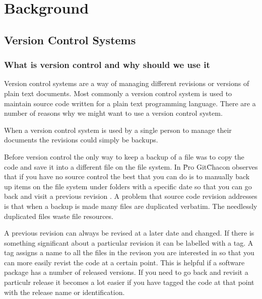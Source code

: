 \chapter{Background}

\section{Version Control Systems}
\subsection{What is version control and why should we use it}
Version control systems are a way of managing different revisions or versions of plain text documents. Most commonly a version control system is used to maintain source code written for a plain text programming language.  There are a number of reasons why we might want to use a version control system.

When a version control system is used by a single person to manage their documents the revisions could simply be backups.

Before version control the only way to keep a backup of a file was to copy the code and save it into a different file on the file system.
In \"Pro Git\" Chacon observes that if you have no source control the best that you can do is to manually back up items on the file system under folders with a specific date so that you can go back and visit a previous revision \cite{Chacon} .  A problem that source code revision addresses is that when a backup is made many files are duplicated verbatim.  The needlessly duplicated files waste file resources.

 A previous revision can always be revised at a later date and changed. If there is something significant about a particular revision it can be labelled with a tag. A tag assigns a name to all the files in the revison you are interested in so that you can more easily revist the code at a certain point.  This is helpful if a software package has a number of released versions.  If you need to go back and revisit a particulr release it becomes a lot easier if you have tagged the code at that point with the release name or identification.

